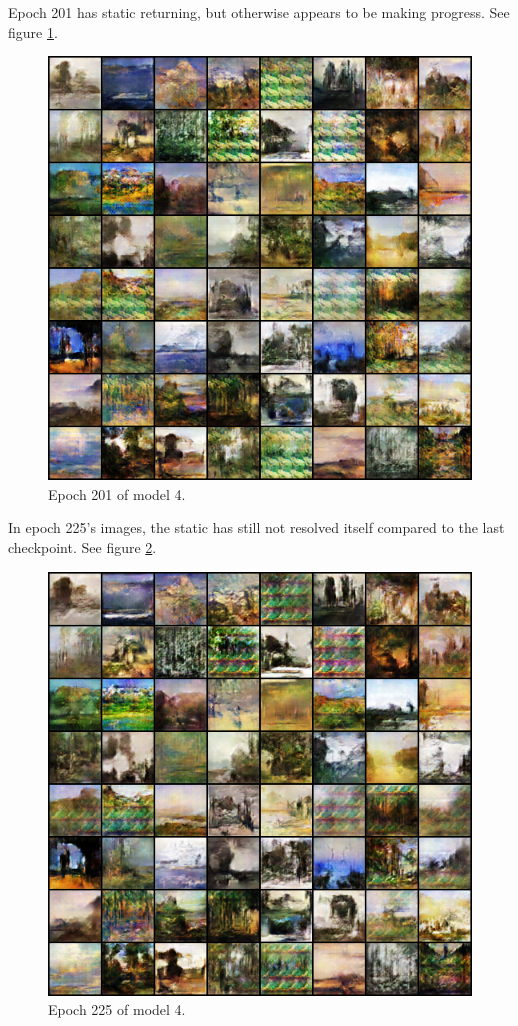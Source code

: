 \documentclass[11pt,letterpaper]{article}
\begin{document}
				Epoch 201 has static returning, but otherwise appears to be making progress.
				See figure \ref{fig:wa64:epoch201generator}.
				\begin{figure}
					\centering
					\includegraphics[width=1.0\linewidth]{results/model4/epoch201_generator}
					\caption{Epoch 201 of model 4.}
					\label{fig:wa64:epoch201generator}
				\end{figure}

				In epoch 225's images, the static has still not resolved itself compared to the last checkpoint.
				See figure \ref{fig:wa64:epoch225generator}.
				\begin{figure}
					\centering
					\includegraphics[width=1.0\linewidth]{results/model4/epoch225_generator}
					\caption{Epoch 225 of model 4.}
					\label{fig:wa64:epoch225generator}
				\end{figure}
\end{document}
